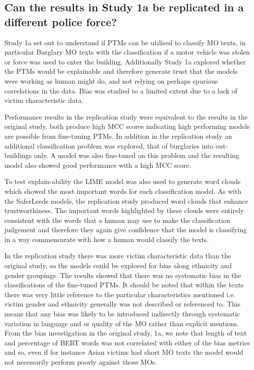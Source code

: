 \subsection{Can the results in Study 1a be replicated in a different police force?}Study 1a set out to understand if PTMs can be utilised to classify MO texts, in particular Burglary MO texts with the classification if a motor vehicle was stolen or force was used to enter the building. Additionally Study 1a explored whether the PTMs would be explainable and therefore generate trust that the models were working as human might do, and not relying on perhaps spurious correlations in the data. Bias was studied to a limited extent due to a lack of victim characteristic data.

Performance results in the replication study were equivalent to the results in the original study, both produce high MCC scores indicating high performing models are possible from fine-tuning PTMs. In addition in the replication study an additional classification problem was explored, that of burglaries into out-buildings only. A model was also fine-tuned on this problem and the resulting model also showed good performance with a high MCC score.

To test explain-ability the LIME model was also used to generate word clouds which showed the most important words for each classification model. As with the SaferLeeds models, the replication study produced word clouds that enhance trustworthiness. The important words highlighted by these clouds were entirely consistent with the words that a human may use to make the classification judgement and therefore they again give confidence that the model is classifying in a way commensurate with how a human would classify the texts.

In the replication study there was more victim characteristic data than the original study, so the models could be explored for bias along ethnicity and gender groupings. The results showed that there was no systematic bias in the classifications of the fine-tuned PTMs. It should be noted that within the texts there was very little reference to the particular characteristics mentioned i.e. victim gender and ethnicity generally was not described or referenced to. This means that any bias was likely to be introduced indirectly through systematic variation in language and or quality of the MO rather than explicit mentions. From the bias investigation in the original study, 1a,  we note that length of text and percentage of BERT words was not correlated with either of the bias metrics and so, even if for instance Asian victims had short MO texts the model would not necessarily perform poorly against those MOs. 


